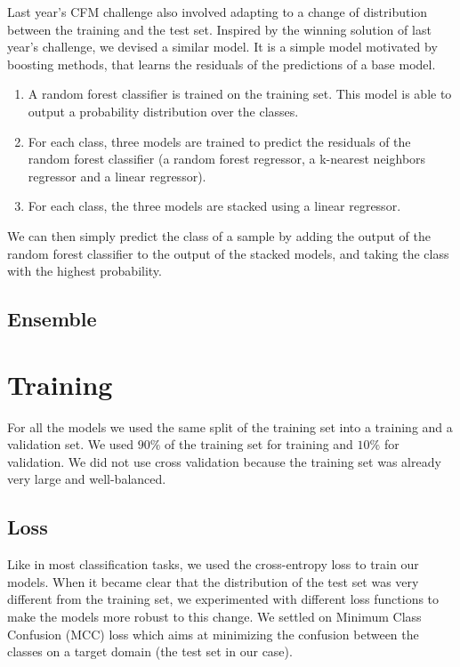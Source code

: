 \documentclass[switch, 11pt]{article}
\begin{document}
\begin{multicols}{2}
    Last year's CFM challenge also involved adapting to a change of distribution between the training and the test set. Inspired by the winning solution of last year's challenge, we devised a similar model. It is a simple model motivated by boosting methods, that learns the residuals of the predictions of a base model.
    \begin{enumerate}
        \item A random forest classifier is trained on the training set. This model is able to output a probability distribution over the classes.
        \item For each class, three models are trained to predict the residuals of the random forest classifier (a random forest regressor, a k-nearest neighbors regressor and a linear regressor).
        \item For each class, the three models are stacked using a linear regressor.
    \end{enumerate}

    We can then simply predict the class of a sample by adding the output of the random forest classifier to the output of the stacked models, and taking the class with the highest probability.

    \subsection{Ensemble}

    \section{Training}

    For all the models we used the same split of the training set into a training and a validation set. We used $90\%$ of the training set for training and $10\%$ for validation. We did not use cross validation because the training set was already very large and well-balanced.

    \subsection{Loss}
    Like in most classification tasks, we used the cross-entropy loss to train our models. When it became clear that the distribution of the test set was very different from the training set, we experimented with different loss functions to make the models more robust to this change. We settled on Minimum Class Confusion (MCC) loss \cite{jin-2020} which aims at minimizing the confusion between the classes on a target domain (the test set in our case).


\end{multicols}
\end{document}
